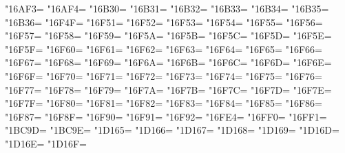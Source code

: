 \XeTeXcharclass"16AF3=\KclassCM
\XeTeXcharclass"16AF4=\KclassCM
\XeTeXcharclass"16B30=\KclassCM
\XeTeXcharclass"16B31=\KclassCM
\XeTeXcharclass"16B32=\KclassCM
\XeTeXcharclass"16B33=\KclassCM
\XeTeXcharclass"16B34=\KclassCM
\XeTeXcharclass"16B35=\KclassCM
\XeTeXcharclass"16B36=\KclassCM
\XeTeXcharclass"16F4F=\KclassCM
\XeTeXcharclass"16F51=\KclassCM
\XeTeXcharclass"16F52=\KclassCM
\XeTeXcharclass"16F53=\KclassCM
\XeTeXcharclass"16F54=\KclassCM
\XeTeXcharclass"16F55=\KclassCM
\XeTeXcharclass"16F56=\KclassCM
\XeTeXcharclass"16F57=\KclassCM
\XeTeXcharclass"16F58=\KclassCM
\XeTeXcharclass"16F59=\KclassCM
\XeTeXcharclass"16F5A=\KclassCM
\XeTeXcharclass"16F5B=\KclassCM
\XeTeXcharclass"16F5C=\KclassCM
\XeTeXcharclass"16F5D=\KclassCM
\XeTeXcharclass"16F5E=\KclassCM
\XeTeXcharclass"16F5F=\KclassCM
\XeTeXcharclass"16F60=\KclassCM
\XeTeXcharclass"16F61=\KclassCM
\XeTeXcharclass"16F62=\KclassCM
\XeTeXcharclass"16F63=\KclassCM
\XeTeXcharclass"16F64=\KclassCM
\XeTeXcharclass"16F65=\KclassCM
\XeTeXcharclass"16F66=\KclassCM
\XeTeXcharclass"16F67=\KclassCM
\XeTeXcharclass"16F68=\KclassCM
\XeTeXcharclass"16F69=\KclassCM
\XeTeXcharclass"16F6A=\KclassCM
\XeTeXcharclass"16F6B=\KclassCM
\XeTeXcharclass"16F6C=\KclassCM
\XeTeXcharclass"16F6D=\KclassCM
\XeTeXcharclass"16F6E=\KclassCM
\XeTeXcharclass"16F6F=\KclassCM
\XeTeXcharclass"16F70=\KclassCM
\XeTeXcharclass"16F71=\KclassCM
\XeTeXcharclass"16F72=\KclassCM
\XeTeXcharclass"16F73=\KclassCM
\XeTeXcharclass"16F74=\KclassCM
\XeTeXcharclass"16F75=\KclassCM
\XeTeXcharclass"16F76=\KclassCM
\XeTeXcharclass"16F77=\KclassCM
\XeTeXcharclass"16F78=\KclassCM
\XeTeXcharclass"16F79=\KclassCM
\XeTeXcharclass"16F7A=\KclassCM
\XeTeXcharclass"16F7B=\KclassCM
\XeTeXcharclass"16F7C=\KclassCM
\XeTeXcharclass"16F7D=\KclassCM
\XeTeXcharclass"16F7E=\KclassCM
\XeTeXcharclass"16F7F=\KclassCM
\XeTeXcharclass"16F80=\KclassCM
\XeTeXcharclass"16F81=\KclassCM
\XeTeXcharclass"16F82=\KclassCM
\XeTeXcharclass"16F83=\KclassCM
\XeTeXcharclass"16F84=\KclassCM
\XeTeXcharclass"16F85=\KclassCM
\XeTeXcharclass"16F86=\KclassCM
\XeTeXcharclass"16F87=\KclassCM
\XeTeXcharclass"16F8F=\KclassCM
\XeTeXcharclass"16F90=\KclassCM
\XeTeXcharclass"16F91=\KclassCM
\XeTeXcharclass"16F92=\KclassCM
\XeTeXcharclass"16FE4=\KclassCM
\XeTeXcharclass"16FF0=\KclassCM
\XeTeXcharclass"16FF1=\KclassCM
\XeTeXcharclass"1BC9D=\KclassCM
\XeTeXcharclass"1BC9E=\KclassCM
\XeTeXcharclass"1D165=\KclassCM
\XeTeXcharclass"1D166=\KclassCM
\XeTeXcharclass"1D167=\KclassCM
\XeTeXcharclass"1D168=\KclassCM
\XeTeXcharclass"1D169=\KclassCM
\XeTeXcharclass"1D16D=\KclassCM
\XeTeXcharclass"1D16E=\KclassCM
\XeTeXcharclass"1D16F=\KclassCM
